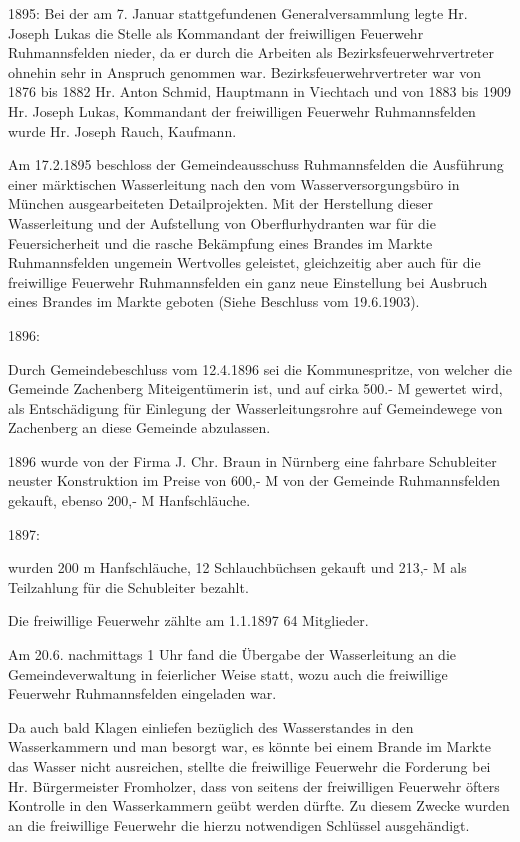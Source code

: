 \documentclass[12pt,a4pager]{book}
\begin{document}
1895:   Bei der am 7. Januar stattgefundenen Generalversammlung legte Hr. Joseph
Lukas die Stelle als Kommandant der freiwilligen Feuerwehr Ruhmannsfelden
nieder, da er durch die Arbeiten als Bezirksfeuerwehrvertreter ohnehin sehr in
Anspruch genommen war. Bezirksfeuerwehrvertreter war von 1876 bis 1882 Hr. Anton
Schmid, Hauptmann in Viechtach und von 1883 bis 1909 Hr. Joseph Lukas,
Kommandant der freiwilligen Feuerwehr Ruhmannsfelden wurde Hr. Joseph Rauch,
Kaufmann.

Am 17.2.1895 beschloss der Gemeindeausschuss Ruhmannsfelden die Ausführung einer
märktischen Wasserleitung nach den vom Wasserversorgungsbüro in München
ausgearbeiteten Detailprojekten. Mit der Herstellung dieser Wasserleitung und
der Aufstellung von Oberflurhydranten war für die Feuersicherheit und die rasche
Bekämpfung eines Brandes im Markte Ruhmannsfelden ungemein Wertvolles geleistet,
gleichzeitig aber auch für die freiwillige Feuerwehr Ruhmannsfelden ein ganz
neue Einstellung bei Ausbruch eines Brandes im Markte geboten (Siehe Beschluss
vom 19.6.1903).

1896:

Durch Gemeindebeschluss vom 12.4.1896 sei die Kommunespritze, von welcher die
Gemeinde Zachenberg Miteigentümerin ist, und auf cirka 500.- M gewertet wird,
als Entschädigung für Einlegung der Wasserleitungsrohre auf Gemeindewege von
Zachenberg an diese Gemeinde abzulassen.

1896 wurde von der Firma J. Chr. Braun in Nürnberg eine fahrbare Schubleiter
neuster Konstruktion im Preise von 600,- M von der Gemeinde Ruhmannsfelden
gekauft, ebenso 200,- M Hanfschläuche.

1897:

wurden 200 m Hanfschläuche, 12 Schlauchbüchsen gekauft und 213,- M als
Teilzahlung für die Schubleiter bezahlt.

Die freiwillige Feuerwehr zählte am 1.1.1897 64 Mitglieder.

Am 20.6. nachmittags 1 Uhr fand die Übergabe der Wasserleitung an die
Gemeindeverwaltung in feierlicher Weise statt, wozu auch die freiwillige
Feuerwehr Ruhmannsfelden eingeladen war.

Da auch bald Klagen einliefen bezüglich des Wasserstandes in den Wasserkammern
und man besorgt war, es könnte bei einem Brande im Markte das Wasser nicht
ausreichen, stellte die freiwillige Feuerwehr die Forderung bei Hr.
Bürgermeister Fromholzer, dass von seitens der freiwilligen Feuerwehr öfters
Kontrolle in den Wasserkammern geübt werden dürfte. Zu diesem Zwecke wurden an
die freiwillige Feuerwehr die hierzu notwendigen Schlüssel ausgehändigt.
\end{document}
